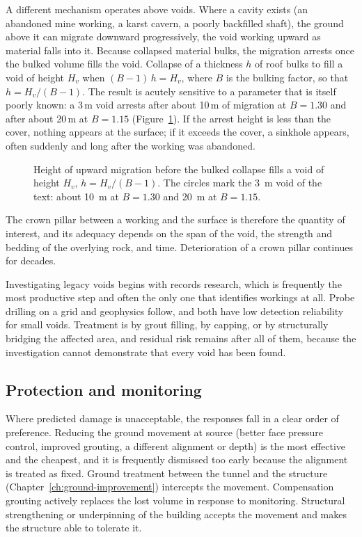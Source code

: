 A different mechanism operates above voids. Where a cavity exists (an
abandoned mine working, a karst cavern, a poorly backfilled shaft), the
ground above it can migrate downward progressively, the void working upward as
material falls into it. Because collapsed material bulks, the migration
arrests once the bulked volume fills the void. Collapse of a thickness $h$ of
roof bulks to fill a void of height $H_v$ when $(B-1)\,h = H_v$, where $B$ is
the bulking factor, so that $h = H_v/(B-1)$. The result is acutely sensitive
to a parameter that is itself poorly known: a 3\,m void arrests after about
10\,m of migration at $B = 1.30$ and after about 20\,m at $B = 1.15$
(Figure~\ref{fig:void-migration}). If the arrest height
is less than the cover, nothing appears at the surface; if it exceeds the
cover, a sinkhole appears, often suddenly and long after the working was
abandoned.

\begin{figure}[htbp]
\centering
{}
\caption{Height of upward migration before the bulked collapse fills a void of height $H_v$, $h = H_v/(B-1)$. The circles mark the 3~m void of the text: about 10~m at $B = 1.30$ and 20~m at $B = 1.15$.}
\label{fig:void-migration}
\end{figure}

The crown pillar between a working and the surface is therefore the quantity
of interest, and its adequacy depends on the span of the void, the strength
and bedding of the overlying rock, and time. Deterioration of a crown
pillar continues for decades.

Investigating legacy voids begins with records research, which is frequently
the most productive step and often the only one that identifies workings at
all. Probe drilling on a grid and geophysics follow, and both have low
detection reliability for small voids. Treatment is by grout filling, by
capping, or by structurally bridging the affected area, and residual risk
remains after all of them, because the investigation cannot demonstrate that
every void has been found.

\subsection{Protection and monitoring}
\label{sec:protection-monitoring}

Where predicted damage is unacceptable, the responses fall in a clear order of
preference. Reducing the ground movement at source (better face pressure
control, improved grouting, a different alignment or depth) is the most
effective and the cheapest, and it is frequently dismissed too early because
the alignment is treated as fixed. Ground treatment between the tunnel and the
structure (Chapter~\ref{ch:ground-improvement}) intercepts the movement.
Compensation grouting actively replaces the lost volume in response to
monitoring. Structural strengthening or underpinning of the building accepts
the movement and makes the structure able to tolerate it.

